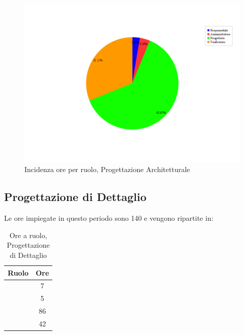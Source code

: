 \begin{figure}[H]
	\centering
	\includegraphics[scale=0.5]{immagini/Grafi/OreRuoloPA}
	\caption{Incidenza ore per ruolo, Progettazione Architetturale}
\end{figure}


\subsection{Progettazione di Dettaglio}
Le ore impiegate in questo periodo sono 140 e vengono ripartite in:
\begin{table}[H]
	\begin{center}
		\begin{tabular}{|c|c|}
			\hline
			\textbf{Ruolo}	& \textbf{Ore} \\
			\hline
			\Res	&	7	\\
			\hline
			\Amm	&	5	\\
			\hline
			\Prog		&	86	\\
			\hline
			\Ver	&	42	\\
			\hline
		\end{tabular}
	\end{center}
	\caption{Ore a ruolo, Progettazione di Dettaglio}
\end{table}

